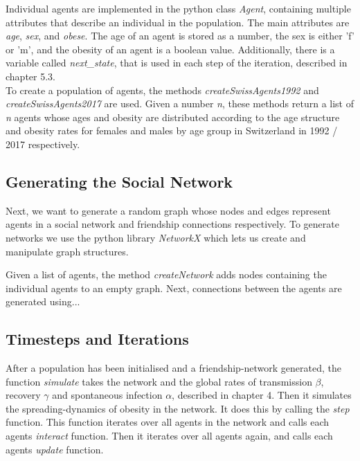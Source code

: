 \documentclass[11pt]{article}
\begin{document}
Individual agents are implemented in the python class \textit{Agent}, containing multiple attributes that describe an individual in the population.
The main attributes are \textit{age}, \textit{sex}, and \textit{obese}. The age of an agent is stored as a number, the sex is either 'f' or 'm', and the obesity of an agent is a boolean value. 
Additionally, there is a variable called \textit{next\_state}, that is used in each step of the iteration, described in chapter 5.3. \\

To create a population of agents, the methods \textit{createSwissAgents1992} and \textit{createSwissAgents2017} are used. 
Given a number \textit{n}, these methods return a list of \textit{n} agents whose ages and obesity are distributed according to the age structure\cite{agestructure} and obesity rates\cite{bmistatistics} for females and males by age group in Switzerland in 1992 / 2017 respectively.

\subsection{Generating the Social Network}

Next, we want to generate a random graph whose nodes and edges represent agents in a social network and friendship connections respectively. To generate networks we use the python library \textit{NetworkX} which lets us create and manipulate graph structures.

Given a list of agents, the method \textit{createNetwork} adds nodes containing the individual agents to an empty graph. Next, connections between the agents are generated using...

\subsection{Timesteps and Iterations}

After a population has been initialised and a friendship-network generated, the function \textit{simulate} takes the network and the global rates of transmission \(\beta\), recovery \(\gamma\) and spontaneous infection \(\alpha\), described in chapter 4. Then it simulates the spreading-dynamics of obesity in the network.
It does this by calling the \textit{step} function. This function iterates over all agents in the network and calls each agents \textit{interact} function. Then it iterates over all agents again, and calls each agents \textit{update} function. \\
\end{document}
